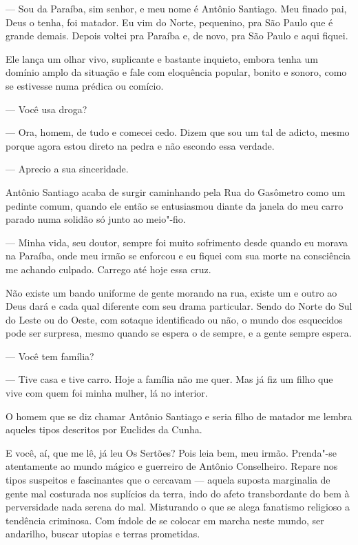  

— Sou da Paraíba, sim senhor, e meu nome é Antônio Santiago. Meu finado
pai, Deus o tenha, foi matador. Eu vim do Norte, pequenino, pra São
Paulo que é grande demais. Depois voltei pra Paraíba e, de novo, pra São
Paulo e aqui fiquei.

Ele lança um olhar vivo, suplicante e bastante inquieto, embora tenha um
domínio amplo da situação e fale com eloquência popular, bonito e
sonoro, como se estivesse numa prédica ou comício.

— Você usa droga?

— Ora, homem, de tudo e comecei cedo. Dizem que sou um tal de adicto,
mesmo porque agora estou direto na pedra e não escondo essa verdade.

— Aprecio a sua sinceridade.

\asterisc{}

Antônio Santiago acaba de surgir caminhando pela Rua do Gasômetro como
um pedinte comum, quando ele então se entusiasmou diante da janela do
meu carro parado numa solidão só junto ao meio"-fio.

— Minha vida, seu doutor, sempre foi muito sofrimento desde quando eu
morava na Paraíba, onde meu irmão se enforcou e eu fiquei com sua morte
na consciência me achando culpado. Carrego até hoje essa cruz.

Não existe um bando uniforme de gente morando na rua, existe um e outro
ao Deus dará e cada qual diferente com seu drama particular. Sendo do
Norte do Sul do Leste ou do Oeste, com sotaque identificado ou não, o
mundo dos esquecidos pode ser surpresa, mesmo quando se espera o de
sempre, e a gente sempre espera.

— Você tem família?

— Tive casa e tive carro. Hoje a família não me quer. Mas já fiz um filho
que vive com quem foi minha mulher, lá no interior.

O homem que se diz chamar Antônio Santiago e seria filho de matador me
lembra aqueles tipos descritos por Euclides da Cunha.

E você, aí, que me lê, já leu Os Sertões? Pois leia bem, meu irmão.
Prenda"-se atentamente ao mundo mágico e guerreiro de Antônio
Conselheiro. Repare nos tipos suspeitos e fascinantes que o cercavam ---
aquela suposta marginalia de gente mal costurada nos suplícios da terra,
indo do afeto transbordante do bem à perversidade nada serena do mal.
Misturando o que se alega fanatismo religioso a tendência criminosa. Com
índole de se colocar em marcha neste mundo, ser andarilho, buscar
utopias e terras prometidas.

